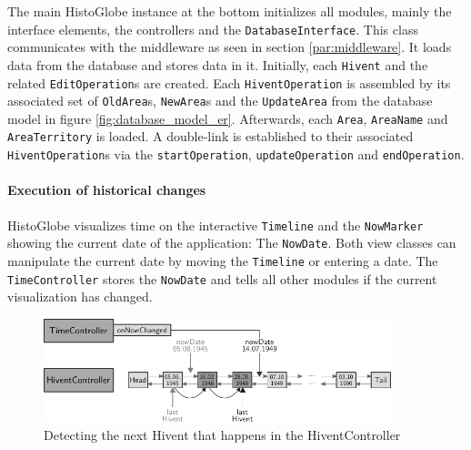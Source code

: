 The main HistoGlobe instance at the bottom initializes all modules, mainly the interface elements, the controllers and the \texttt{DatabaseInterface}. This class communicates with the middleware as seen in section \ref{par:middleware}. It loads data from the database and stores data in it. Initially, each \texttt{Hivent} and the related \texttt{EditOperation}s are created. Each \texttt{HiventOperation} is assembled by its associated set of \texttt{OldArea}s, \texttt{NewArea}s and the \texttt{UpdateArea} from the database model in  figure \ref{fig:database_model_er}. Afterwards, each \texttt{Area}, \texttt{AreaName} and \texttt{AreaTerritory} is loaded. A double-link is established to their associated \texttt{HiventOperation}s via the \texttt{startOperation}, \texttt{updateOperation} and \texttt{endOperation}.


\paragraph{Execution of historical changes} %
\label{par:executing_historical_changes}

HistoGlobe visualizes time on the interactive \texttt{Timeline} and the \texttt{NowMarker} showing the current date of the application: The \texttt{NowDate}. Both view classes can manipulate the current date by moving the \texttt{Timeline} or entering a date. The \texttt{TimeController} stores the \texttt{NowDate} and tells all other modules if the current visualization has changed.

\begin{figure}[ht]
  \vspace{1em}
  \centering
  \includegraphics[width=0.9\textwidth]{graphics/development/implementation/hivent_controller}
  \caption{Detecting the next Hivent that happens in the HiventController}
  \label{fig:hivent_controller}
\end{figure}

